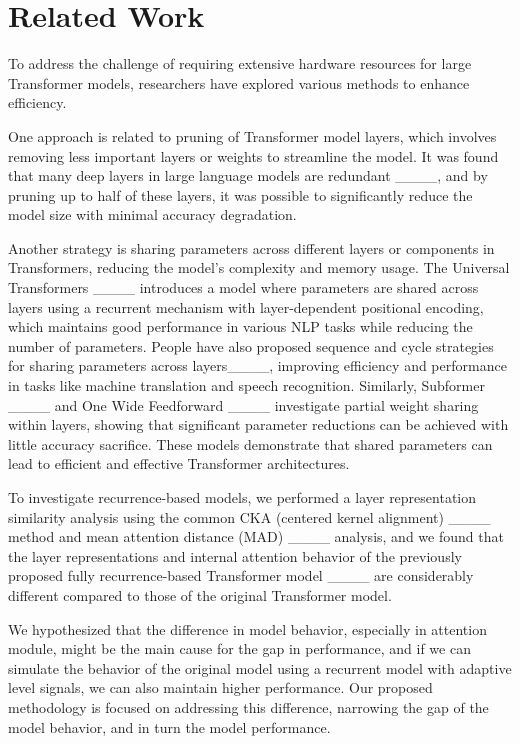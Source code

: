 \section{Related Work}
\label{2.2.pe transformer}
To address the challenge of requiring extensive hardware resources for large Transformer models, researchers have explored various methods to enhance efficiency.

One approach is related to pruning of Transformer model layers, which involves removing less important layers or weights to streamline the model. It was found that many deep layers in large language models are redundant ____, and by pruning up to half of these layers, it was possible to significantly reduce the model size with minimal accuracy degradation. 

Another strategy is sharing parameters across different layers or components in Transformers, reducing the model's complexity and memory usage. The Universal Transformers ____ introduces a model where parameters are shared across layers using a recurrent mechanism with layer-dependent positional encoding, which maintains good performance in various NLP tasks while reducing the number of parameters. People have also proposed sequence and cycle strategies for sharing parameters across layers____, improving efficiency and performance in tasks like machine translation and speech recognition. Similarly, Subformer ____ and One Wide Feedforward ____ investigate partial weight sharing within layers, showing that significant parameter reductions can be achieved with little accuracy sacrifice. These models demonstrate that shared parameters can lead to efficient and effective Transformer architectures.

To investigate recurrence-based models, we performed a layer representation similarity analysis using the common CKA (centered kernel alignment) ____ method and mean attention distance (MAD) ____ analysis, and we found that the layer representations and internal attention behavior of the previously proposed fully recurrence-based Transformer model ____ are considerably different compared to those of the original Transformer model.

We hypothesized that the difference in model behavior, especially in attention module, might be the main cause for the gap in performance, and if we can simulate the behavior of the original model using a recurrent model with adaptive level signals, we can also maintain higher performance. Our proposed methodology is focused on addressing this difference, narrowing the gap of the model behavior, and in turn the model performance.